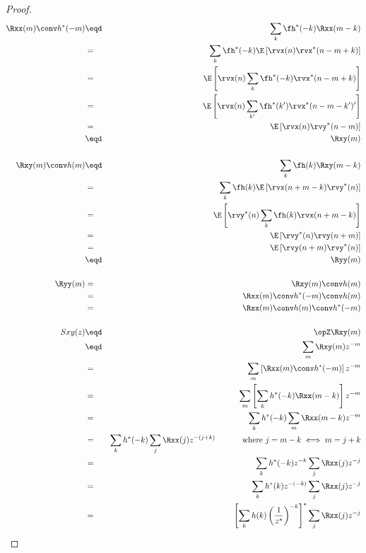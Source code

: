 \begin{proof}
\begin{eqnarray*}
   \Rxx(m) \conv h^\ast(-m)
     &\eqd& \sum_k \fh^\ast(-k) \Rxx(m-k)
   \\&=&    \sum_k \fh^\ast(-k) \E\left[\rvx(n) \rvx^\ast(n-m+k) \right]
   \\&=&    \E\left[\rvx(n) \sum_k \fh^\ast(-k)  \rvx^\ast(n-m+k)     \right]
   \\&=&    \E\left[\rvx(n) \sum_{k^\prime} \fh^\ast(k^\prime)  \rvx^\ast(n-m-k^\prime)  ^\prime   \right]
   \\&=&    \E\left[\rvx(n) \rvy^\ast(n-m)  \right]
   \\&\eqd& \Rxy(m)
\\
\\
   \Rxy(m) \conv h(m)
     &\eqd& \sum_k \fh(k) \Rxy(m-k)
   \\&=&    \sum_k \fh(k) \E\left[\rvx(n+m-k) \rvy^\ast(n) \right]
   \\&=&    \E\left[\rvy^\ast(n) \sum_k \fh(k) \rvx(n+m-k)    \right]
   \\&=&    \E\left[\rvy^\ast(n) \rvy(n+m) \right]
   \\&=&    \E\left[ \rvy(n+m) \rvy^\ast(n)\right]
   \\&\eqd& \Ryy(m)
\\
\\
   \Ryy(m)
     &=& \Rxy(m) \conv h(m)
   \\&=& \Rxx(m) \conv h^\ast(-m) \conv h(m)
   \\&=& \Rxx(m) \conv h(m)  \conv h^\ast(-m)
\\
\\
   Sxy(z)
     &\eqd& \opZ \Rxy(m)
   \\&\eqd& \sum_m \Rxy(m) z^{-m}
   \\&=&    \sum_m \left[ \Rxx(m) \conv h^\ast(-m) \right] z^{-m}
   \\&=&    \sum_m \left[ \sum_k h^\ast(-k) \Rxx(m-k)  \right] z^{-m}
   \\&=&    \sum_k h^\ast(-k) \sum_m \Rxx(m-k)z^{-m}
   \\&=&    \sum_k h^\ast(-k) \sum_j \Rxx(j)z^{-(j+k)}
            \hspace{3em}\mbox{ where $j=m-k\iff m=j+k$}
   \\&=&    \sum_k h^\ast(-k) z^{-k}   \sum_j \Rxx(j)z^{-j}
   \\&=&    \sum_k h^\ast(k) z^{-(-k)}   \sum_j \Rxx(j)z^{-j}
   \\&=&    \left[\sum_k h(k) \left(\frac{1}{z^\ast}\right)^{-k} \right]^\ast  \sum_j \Rxx(j)z^{-j}

\end{eqnarray*}
\end{proof}
